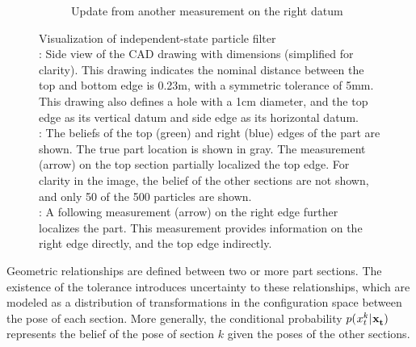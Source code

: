 \documentclass[../thesis.tex]{subfiles}
\begin{document}
\begin{figure}
\begin{subfigure}[b]{.9\linewidth}
    \caption{Update from another measurement on the right datum}
    \label{fig:Overview:belief_right}
  \end{subfigure}
  \caption{
    Visualization of independent-state particle filter\\
\protect{}: Side view of the CAD drawing with dimensions (simplified for clarity). 
This drawing indicates the nominal distance between the top and bottom edge is 0.23m, with a symmetric tolerance of 5mm.
This drawing also defines a hole with a 1cm diameter, and the top edge as its vertical datum and side edge as its horizontal datum.\\ 
\protect{}: The beliefs of the top (green) and right (blue) edges of the part are shown. 
The true part location is shown in gray. 
The measurement (arrow) on the top section partially localized the top edge.
For clarity in the image, the belief of the other sections are not shown, and only 50 of the 500 particles are shown.\\
\protect{}: 
A following measurement (arrow) on the right edge further localizes the part. 
This measurement provides information on the right edge directly, and the top edge indirectly.
}
  \label{fig:Overview}
\end{figure}

Geometric relationships are defined between two or more part sections. The existence of the tolerance introduces uncertainty to these relationships, which are modeled as a distribution of transformations in the configuration space between the pose of each section. 
More generally, the conditional probability $p(\particle[t][][k]|\mathbf{\particle[t]})$ represents the belief of the pose of section $k$ given the poses of the other sections.


%
%	
\end{document}
